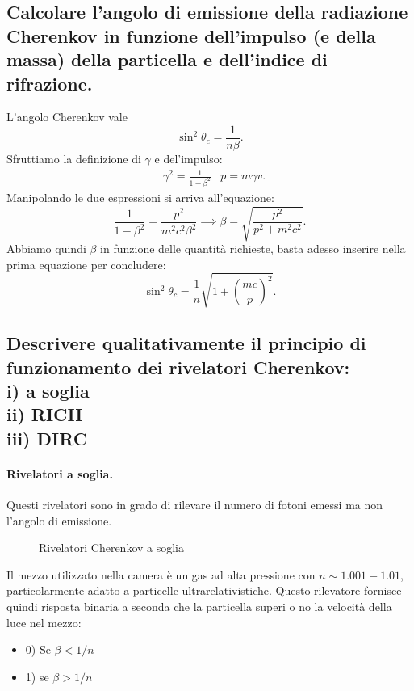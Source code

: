 \subsection[ Angolo di emissione Cherenkov in funzione dell'impulso]{Calcolare l’angolo di emissione della radiazione Cherenkov in funzione dell’impulso (e della massa) della particella e dell’indice di rifrazione.
}
\label{sec:4.b.4}
L'angolo Cherenkov vale \[
	\sin^2\theta_{c}= \frac{1}{n \beta}
.\] 
Sfruttiamo la definizione di $\gamma$ e del'impulso:
\begin{align*}
	&\gamma^2 = \frac{1}{1-\beta^2}		&p = m\gamma v
.\end{align*}
Manipolando le due espressioni si arriva all'equazione:
\[
	\frac{1}{1-\beta^2} = \frac{p^2}{m^2c^2\beta^2}  \implies \beta = \sqrt{\frac{p^2}{p^2+m^2c^2}} 
.\] 
Abbiamo quindi $\beta$ in funzione delle quantità richieste, basta adesso inserire nella prima equazione per concludere:
\[
	\sin^2\theta_{c}=\frac{1}{n} \sqrt{1+\left( \frac{mc}{p} \right)^2} 
.\] 

\subsection[ Funzionamento di vari tipi di rivelatori]{Descrivere qualitativamente il principio di funzionamento dei rivelatori Cherenkov: \\
	i) a soglia\\
	ii) RICH\\ 
	iii) DIRC
}
\label{sec:4.b.5}
\paragraph{Rivelatori a soglia.}%
Questi rivelatori sono in grado di rilevare il numero di fotoni emessi ma non l'angolo di emissione.
\begin{figure}[H]
    \centering
    \caption{Rivelatori Cherenkov a soglia}
    \label{fig:rivelatori-checklist-a-soglia}
\end{figure}
Il mezzo utilizzato nella camera è un gas ad alta pressione con $n \sim 1.001 - 1.01$, particolarmente adatto a particelle ultrarelativistiche. Questo rilevatore fornisce quindi risposta binaria a seconda che la particella superi o no la velocità della luce nel mezzo:
\begin{itemize}
	\item 0) Se $\beta < 1 /n$
	\item 1) se $\beta > 1 /n$
\end{itemize}
